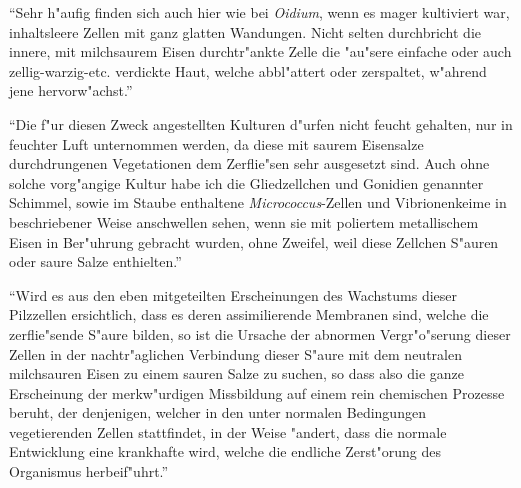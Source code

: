 \documentclass[a4paper, 11pt, oneside]{article}
\begin{document}
"`Sehr h"aufig finden sich auch hier wie bei \emph{Oidium}, wenn es mager kultiviert war, inhaltsleere Zellen mit ganz glatten Wandungen. Nicht selten durchbricht die innere, mit milchsaurem Eisen durchtr"ankte Zelle die "au"sere einfache oder auch zellig-warzig-etc. verdickte Haut, welche abbl"attert oder zerspaltet, w"ahrend jene hervorw"achst."'

"`Die f"ur diesen Zweck angestellten Kulturen d"urfen nicht feucht gehalten, nur in feuchter Luft unternommen werden, da diese mit saurem Eisensalze durchdrungenen Vegetationen dem Zerflie"sen sehr ausgesetzt sind. Auch ohne solche vorg"angige Kultur habe ich die Gliedzellchen und Gonidien genannter Schimmel, sowie im Staube enthaltene \emph{Micrococcus}-Zellen und Vibrionenkeime in beschriebener Weise anschwellen sehen, wenn sie mit poliertem metallischem Eisen in Ber"uhrung gebracht wurden, ohne Zweifel, weil diese Zellchen S"auren oder saure Salze enthielten."'

"`Wird es aus den eben mitgeteilten Erscheinungen des Wachstums dieser Pilzzellen ersichtlich, dass es deren assimilierende Membranen sind, welche die zerflie"sende S"aure bilden, so ist die Ursache der abnormen Vergr"o"serung dieser Zellen in der nachtr"aglichen Verbindung dieser S"aure mit dem neutralen milchsauren Eisen zu einem sauren Salze zu suchen, so dass also die ganze Erscheinung der merkw"urdigen Missbildung auf einem rein chemischen Prozesse beruht, der denjenigen, welcher in den unter normalen Bedingungen vegetierenden Zellen stattfindet, in der Weise "andert, dass die normale Entwicklung eine krankhafte wird, welche die endliche Zerst"orung des Organismus herbeif"uhrt."'
\end{document}
